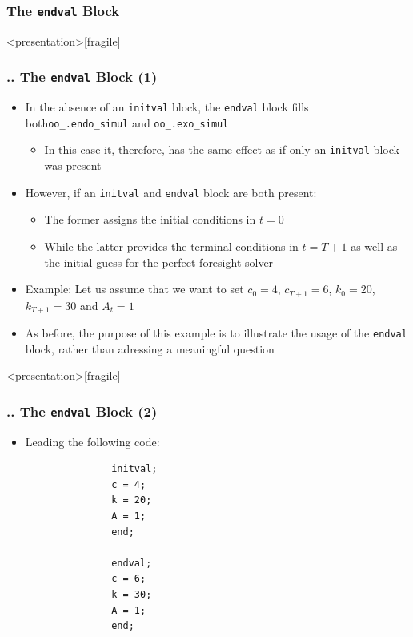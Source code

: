 \documentclass[11pt,aspectratio=169]{beamer}
\begin{document}
\subsubsection{The \texttt{endval} Block}
\begin{frame}<presentation>[fragile]
	\frametitle{{\thesection.\thesubsection.\thesubsubsection} The \texttt{endval} Block (1)}
	\begin{itemize}
		\item In the absence of an \texttt{initval} block, the \texttt{endval} block fills both\linebreak \texttt{oo\_.endo\_simul} and \texttt{oo\_.exo\_simul}
		\begin{itemize}
			\item In this case it, therefore, has the same effect as if only an \texttt{initval} block was present
		\end{itemize}
		\item However, if an \texttt{initval} and  \texttt{endval} block are both present:
		\begin{itemize}
			\item The former assigns the initial conditions in $t=0$
			\item While the latter provides the terminal conditions in $t=T+1$ as well as the initial guess for the perfect foresight solver
		\end{itemize} 
		\item Example: Let us assume that we want to set $c_0=4$, $c_{T+1}=6$, $k_0=20$, $k_{T+1}=30$ and $A_t=1$
		\item As before, the purpose of this example is to illustrate the usage of the \texttt{endval} block, rather than adressing a meaningful question
	\end{itemize}
\end{frame}
\begin{frame}<presentation>[fragile]
	\frametitle{{\thesection.\thesubsection.\thesubsubsection} The \texttt{endval} Block (2)}
	\begin{itemize}
		\item Leading the following code:
			\begin{verbatim}
			   initval;
			   c = 4;
			   k = 20;
			   A = 1;
			   end;

			   endval;
			   c = 6;
			   k = 30;
			   A = 1;
			   end;
			\end{verbatim}
	\end{itemize}
\end{frame}
\end{document}
